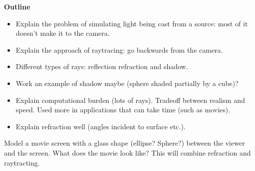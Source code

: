 

{\bf Outline}

\begin{itemize}
\item Explain the problem of simulating light being cast from a source: most of it doesn't make it to the camera.
\item Explain the approach of raytracing: go backwards from the camera.
\item Different types of rays: reflection refraction and shadow.
\item Work an example of shadow maybe (sphere shaded partially by a cube)?
\item Explain computational burden (lots of rays). Tradeoff between realism and speed. Used more in applications that can take time (such as movies).
\item Explain refraction well (angles incident to surface etc.).
\end{itemize}

\begin{problem}
Model a movie screen with a glass shape (ellipse? Sphere?) between the viewer and the screen. What does the movie look like? This will combine refraction and raytracting.
\end{problem}

